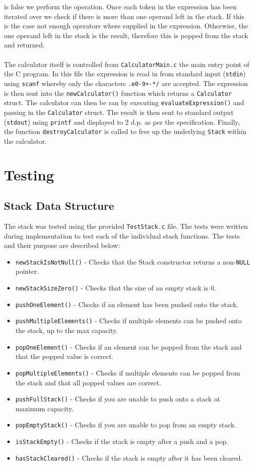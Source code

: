 \documentclass{article}
\begin{document}
is false we perform the operation. Once each token in the expression has been iterated over we check if there is more than one operand left in the stack. If this is the case not enough operators where supplied in the expression. Otherwise, the one operand left in the stack is the result, therefore this is popped from the stack and returned. \\ \\ \noindent The calculator itself is controlled from \verb+CalculatorMain.c+ the main entry point of the C program. In this file the expression is read in from standard input (\verb+stdin+) using \verb+scanf+ whereby only the characters \verb^.e0-9+-*/^ are accepted. The expression is then sent into the \verb+newCalculator()+ function which returns a \verb+Calculator+ struct. The calculator can then be ran by executing \verb+evaluateExpression()+ and passing in the \verb+Calculator+ struct. The result is then sent to standard output (\verb+stdout+) using \verb+printf+ and displayed to 2 d.p. as per the specification. Finally, the function \verb+destroyCalculator+ is called to free up the underlying \verb+Stack+ within the calculator.

\section{Testing}
\subsection{Stack Data Structure}
The stack was tested using the provided \verb+TestStack.c+ file. The tests were written during implementation to test each of the individual stack functions. The tests and their purpose are described below:
\begin{itemize}
\item \verb+newStackIsNotNull()+ - Checks that the Stack constructor returns a non-\verb+NULL+ pointer.
\item \verb+newStackSizeZero()+ - Checks that the size of an empty stack is 0.
\item \verb+pushOneElement()+ - Checks if an element has been pushed onto the stack.
\item \verb+pushMultipleElements()+ - Checks if multiple elements can be pushed onto the stack, up to the max capacity.
\item \verb+popOneElement()+ - Checks if an element can be popped from the stack and that the popped value is correct.
\item \verb+popMultipleElements()+ - Checks if multiple elements can be popped from the stack and that all popped values are correct.
\item \verb+pushFullStack()+ - Checks if you are unable to push onto a stack at maximum capacity.
\item \verb+popEmptyStack()+ - Checks if you are unable to pop from an empty stack.
\item \verb+isStackEmpty()+ - Checks if the stack is empty after a push and a pop.
\item \verb+hasStackCleared()+ - Checks if the stack is empty after it has been cleared. \\
\end{itemize}
\end{document}
